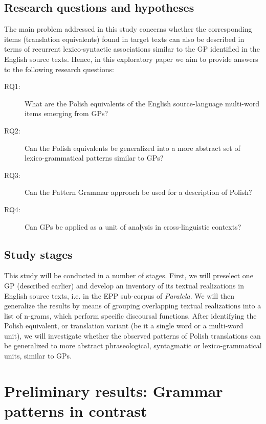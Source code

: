 \documentclass[output=paper]{langscibook}
\begin{document}
\subsection{Research questions and hypotheses}

The main problem addressed in this study concerns whether the corresponding items (translation equivalents) found in target texts can also be described in terms of recurrent lexico-syntactic associations similar to the GP identified in the English source texts. Hence, in this exploratory paper we aim to provide answers to the following research questions:

\begin{description}
\item[RQ1:] What are the Polish equivalents of the English source-language multi-word items emerging from GPs?
\item[RQ2:] Can the Polish equivalents be generalized into a more abstract set of lexico-grammatical patterns similar to GPs?
\item[RQ3:] Can the Pattern Grammar approach be used for a description of Polish?
\item[RQ4:] Can GPs be applied as a unit of analysis in cross-linguistic contexts?
\end{description}

\subsection{Study stages}

This study will be conducted in a number of stages. First, we will preselect one GP (described earlier) and develop an inventory of its textual realizations in English source texts, i.e. in the EPP sub-corpus of \textit{Paralela}. We will then generalize the results by means of grouping overlapping textual realizations into a list of n-grams, which perform specific discoursal functions. After identifying the Polish equivalent, or translation variant (be it a single word or a multi-word unit), we will investigate whether the observed patterns of Polish translations can be generalized to more abstract phraseological, syntagmatic or lexico-grammatical units, similar to GPs.

\section{Preliminary results: Grammar patterns in contrast}
\end{document}
